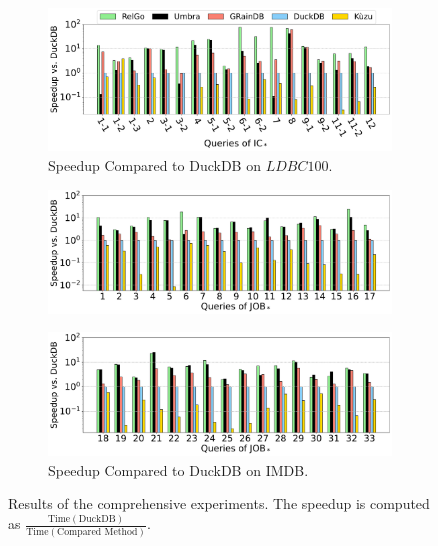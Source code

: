 \begin{figure}[t]
    \centering
    \begin{subfigure}[b]{\linewidth}
        \centering
        \includegraphics[width=.9\linewidth]{./figures/exp/e2e_sf100.pdf}
        \vspace{-.5em}
        \caption{Speedup Compared to DuckDB on $LDBC100$.}
        \label{fig:exp-e2e-sf100}
    \end{subfigure}
    \begin{subfigure}[b]{\linewidth}
        \centering
        \includegraphics[width=.9\linewidth]{./figures/exp/e2e_job_part1.pdf}
    \end{subfigure}
    \begin{subfigure}[b]{\linewidth}
        \centering
        \includegraphics[width=.9\linewidth]{./figures/exp/e2e_job_part2.pdf}
        \caption{Speedup Compared to DuckDB on IMDB.}
        \label{fig:exp-e2e-job}
    \end{subfigure}
    \caption{Results of the comprehensive experiments. The speedup is computed as $\frac{\text{Time}(\text{DuckDB})}{\text{Time}(\text{Compared Method})}$. }
    \label{fig:exp-e2e}
    \vspace{-1em}
\end{figure}

